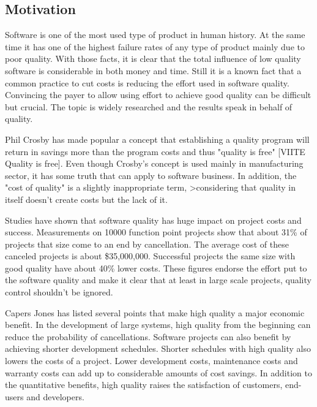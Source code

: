 

\subsection{Motivation}

Software is one of the most used type of product in human history. At the same time it has one of the highest failure rates of any type of product mainly due to poor quality. With those facts, it is clear that the total influence of low quality software is considerable in both money and time. Still it is a known fact that a common practice to cut costs is reducing the effort used in software quality. Convincing the payer to allow using effort to achieve good quality can be difficult but crucial. The topic is widely researched and the results speak in behalf of quality.

Phil Crosby has made popular a concept that establishing a quality program will return in savings more than the program costs and thus "quality is free" [VIITE Quality is free]. Even though Crosby's concept is used mainly in manufacturing sector, it has some truth that can apply to software business.  In addition, the "cost of quality" is a slightly inappropriate term, >considering that quality in itself doesn't create costs but the lack of it. 

Studies have shown that software quality has huge impact on project costs and success. Measurements on 10000 function point projects show that about 31\% of projects that size come to an end by cancellation. The average cost of these canceled projects is about \$35,000,000. Successful projects the same size with good quality have about 40\% lower costs. These figures endorse the effort put to the software quality and make it clear that at least in large scale projects, quality control shouldn't be ignored.

Capers Jones has listed several points that make high quality a major economic benefit. In the development of large systems, high quality from the beginning can reduce the probability of cancellations. Software projects can also benefit by achieving shorter development schedules. Shorter schedules with high quality also lowers the costs of a project. Lower development costs, maintenance costs and warranty costs can add up to considerable amounts of cost savings. In addition to the quantitative benefits, high quality raises the satisfaction of customers, end-users and developers. 

